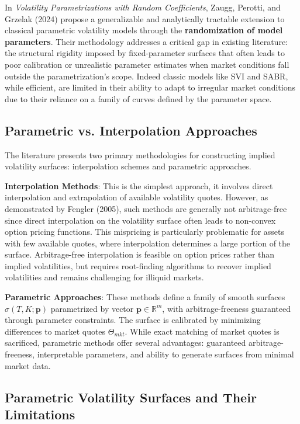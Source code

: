 In \textit{Volatility Parametrizations with Random Coefficients}, Zaugg, Perotti, and Grzelak (2024) \cite{zaugg2024volatility} propose a generalizable and analytically tractable extension to classical parametric volatility models through the \textbf{randomization of model parameters}.
Their methodology addresses a critical gap in existing literature: the structural rigidity imposed by fixed-parameter surfaces that often leads to poor calibration or unrealistic parameter estimates when market conditions fall outside the parametrization's scope.
Indeed classic models like SVI and SABR, while efficient, are limited in their ability to adapt to irregular market conditions due to their reliance on a family of curves defined by the parameter space.

\subsection{Parametric vs. Interpolation Approaches}

The literature presents two primary methodologies for constructing implied volatility surfaces: interpolation schemes and parametric approaches.

\textbf{Interpolation Methods}: This is the simplest approach, it involves direct interpolation and extrapolation of available volatility quotes.
However, as demonstrated by Fengler (2005), such methods are generally not arbitrage-free since direct interpolation on the volatility surface often leads to non-convex option pricing functions. This mispricing is particularly problematic for assets with few available quotes, where interpolation determines a large portion of the surface. Arbitrage-free interpolation is feasible on option prices rather than implied volatilities, but requires root-finding algorithms to recover implied volatilities and remains challenging for illiquid markets.

\textbf{Parametric Approaches}: These methods define a family of smooth surfaces $\hat{\sigma}(T,K;\mathbf{p})$ parametrized by vector $\mathbf{p} \in \mathbb{R}^m$, with arbitrage-freeness guaranteed through parameter constraints. The surface is calibrated by minimizing differences to market quotes $\Theta_{mkt}$. While exact matching of market quotes is sacrificed, parametric methods offer several advantages: guaranteed arbitrage-freeness, interpretable parameters, and ability to generate surfaces from minimal market data.

\subsection{Parametric Volatility Surfaces and Their Limitations}

